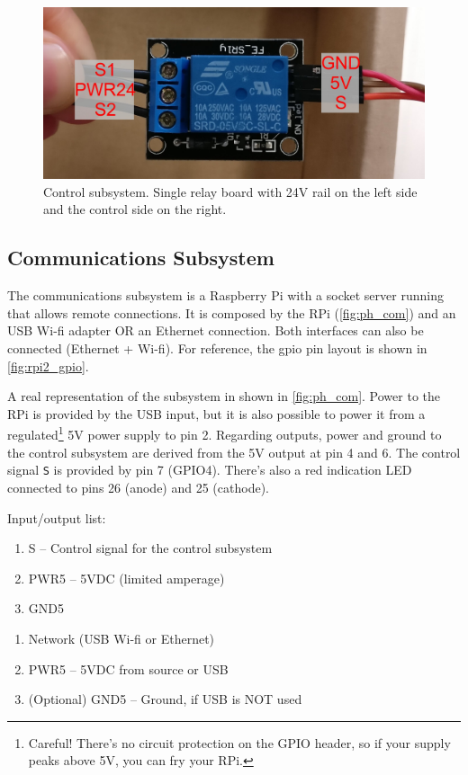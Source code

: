 \documentclass[twoside,a4paper]{refart}
\begin{document}
\begin{figure}[H]
	\centering
	\includegraphics[width=1.0\linewidth]{ph_control}
	\caption{Control subsystem. Single relay board with 24V rail on the left side and the control side on the right.}
	\label{fig:ph_control}
\end{figure}

\subsection{Communications Subsystem}
The communications subsystem is a Raspberry Pi with a socket server running that allows remote connections. It is composed by the RPi (\cref{fig:ph_com}) and an USB Wi-fi adapter OR an Ethernet connection. Both interfaces can also be connected (Ethernet + Wi-fi). For reference, the \gls{gpio} pin layout is shown in \cref{fig:rpi2_gpio}.

A real representation of the subsystem in shown in \cref{fig:ph_com}. Power to the RPi is provided by the \mu USB input, but it is also possible to power it from a regulated\footnote{Careful! There's no circuit protection on the GPIO header, so if your supply peaks above 5V, you can fry your RPi.} 5V power supply to pin 2. Regarding outputs, power and ground to the control subsystem are derived from the 5V output at pin 4 and 6. The control signal {\tt S} is provided by pin 7 (GPIO4). There's also a red indication LED connected to pins 26 (anode) and 25 (cathode).



Input/output list:
\begin{enumerate}
	\item  {} S -- Control signal for the control subsystem
	\item PWR5 -- 5VDC (limited amperage)
	\item GND5
\end{enumerate}
\begin{enumerate}
	\item  {} Network (USB Wi-fi or Ethernet)
	\item PWR5 -- 5VDC from source or USB
	\item (Optional) GND5 -- Ground, if USB is NOT used
\end{enumerate}
\end{document}
